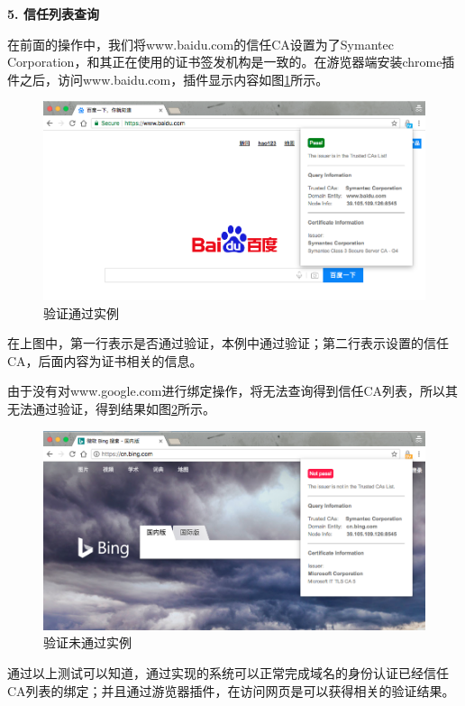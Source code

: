 \noindent\textbf{5. 信任列表查询}

在前面的操作中，我们将www.baidu.com的信任CA设置为了Symantec Corporation，和其正在使用的证书签发机构是一致的。在游览器端安装chrome插件之后，访问www.baidu.com，插件显示内容如图\ref{fig:pass}所示。

\begin{figure}[htbp]
 	\centering
 	\includegraphics[scale=0.3]{img/pass}
 	\caption{验证通过实例}\label{fig:pass}
\end{figure}

在上图中，第一行表示是否通过验证，本例中通过验证；第二行表示设置的信任CA，后面内容为证书相关的信息。


由于没有对www.google.com进行绑定操作，将无法查询得到信任CA列表，所以其无法通过验证，得到结果如图\ref{fig:notPass}所示。

\begin{figure}[htbp]
 	\centering
 	\includegraphics[scale=0.3]{img/notPass}
 	\caption{验证未通过实例}\label{fig:notPass}
\end{figure}


通过以上测试可以知道，通过实现的系统可以正常完成域名的身份认证已经信任CA列表的绑定；并且通过游览器插件，在访问网页是可以获得相关的验证结果。

